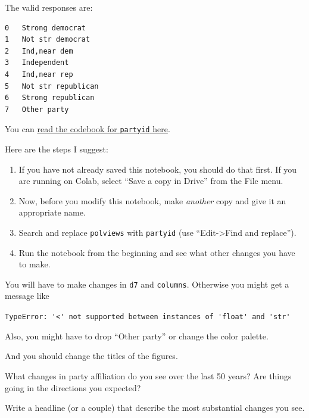 The valid responses are:

\begin{lstlisting}[style=output]
0   Strong democrat
1   Not str democrat
2   Ind,near dem
3   Independent
4   Ind,near rep
5   Not str republican
6   Strong republican
7   Other party
\end{lstlisting}

You can
\href{https://gssdataexplorer.norc.org/projects/52787/variables/141/vshow}{read
the codebook for \passthrough{\lstinline!partyid!} here}.

Here are the steps I suggest:

\begin{enumerate}
\def\labelenumi{\arabic{enumi})}
\item
  If you have not already saved this notebook, you should do that first.
  If you are running on Colab, select ``Save a copy in Drive'' from the
  File menu.
\item
  Now, before you modify this notebook, make \emph{another} copy and
  give it an appropriate name.
\item
  Search and replace \passthrough{\lstinline!polviews!} with
  \passthrough{\lstinline!partyid!} (use ``Edit-\textgreater Find and
  replace'').
\item
  Run the notebook from the beginning and see what other changes you
  have to make.
\end{enumerate}

You will have to make changes in \passthrough{\lstinline!d7!} and
\passthrough{\lstinline!columns!}. Otherwise you might get a message
like

\passthrough{\lstinline!TypeError: '<' not supported between instances of 'float' and 'str'!}

Also, you might have to drop ``Other party'' or change the color
palette.

And you should change the titles of the figures.

What changes in party affiliation do you see over the last 50 years? Are
things going in the directions you expected?

Write a headline (or a couple) that describe the most substantial
changes you see.

